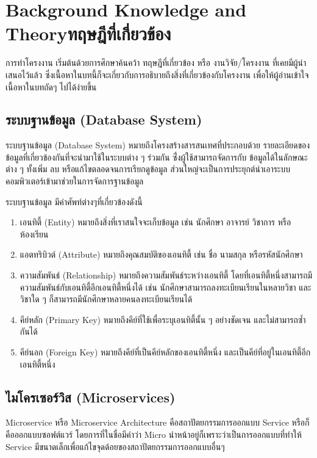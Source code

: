 \chapter{\ifenglish Background Knowledge and Theory\else ทฤษฎีที่เกี่ยวข้อง\fi}

\hspace{1.27cm}การทำโครงงาน เริ่มต้นด้วยการศึกษาค้นคว้า ทฤษฎีที่เกี่ยวข้อง หรือ งานวิจัย/โครงงาน ที่เคยมีผู้นำเสนอไว้แล้ว ซึ่งเนื้อหาในบทนี้ก็จะเกี่ยวกับการอธิบายถึงสิ่งที่เกี่ยวข้องกับโครงงาน เพื่อให้ผู้อ่านเข้าใจเนื้อหาในบทถัดๆ ไปได้ง่ายขึ้น

\section{ระบบฐานข้อมูล (Database System)}
\hspace{1.27cm}ระบบฐานข้อมูล (Database System) หมายถึงโครงสร้างสารสนเทศที่ประกอบด้วย รายละเอียดของข้อมูลที่เกี่ยวข้องกันที่จะนำมาใช้ในระบบต่าง ๆ ร่วมกัน  ซึ่่งผู้ใช้สามารถจัดการกับ
ข้อมูลได้ในลักษณะต่าง ๆ ทั้งเพิ่ม ลบ หรือแก้ไขตลอดจนการเรียกดูข้อมูล ส่วนใหญ่จะเป็นการประยุกต์นำเอาระบบคอมพิวเตอร์เข้ามาช่วยในการจัดการฐานข้อมูล

ระบบฐานข้อมูล มีคำศัพท์ต่างๆที่เกี่ยวข้องดังนี้

\begin{enumerate}
  \hangindent=2em 
  \item เอนทิตี้ (Entity) หมายถึงสิ่งที่เราสนใจจะเก็บข้อมูล เช่น นักศึกษา อาจารย์ วิชาการ หรือห้องเรียน
  \item แอตทริบิวต์ (Attribute) หมายถึงคุณสมบัติของเอนทิตี้ เช่น ชื่อ นามสกุล หรือรหัสนักศึกษา
  \item ความสัมพันธ์ (Relationship) หมายถึงความสัมพันธ์ระหว่างเอนทิตี้ โดยที่เอนทิตี้หนึ่งสามารถมีความสัมพันธ์กับเอนทิตี้อีกเอนทิตี้หนึ่งได้ เช่น นักศึกษาสามารถลงทะเบียนเรียนในหลายวิชา และวิชาใด ๆ ก็สามารถมีนักศึกษาหลายคนลงทะเบียนเรียนได้
  \item คีย์หลัก (Primary Key) หมายถึงคีย์ที่ใช้เพื่อระบุเอนทิตี้นั้น ๆ อย่างชัดเจน และไม่สามารถซ้ำกันได้  
  \item คีย์นอก (Foreign Key) หมายถึงคีย์ที่เป็นคีย์หลักของเอนทิตี้หนึ่ง และเป็นคีย์ที่อยู่ในเอนทิตี้อีกเอนทิตี้หนึ่ง  
\end{enumerate}



\section{ไมโครเซอร์วิส (Microservices)}
\hspace{1.27cm}Microservice\cite{microservice} หรือ Microservice Architecture คือสถาปัตยกรรมการออกแบบ Service หรือก็คือออกแบบซอฟต์แวร์ โดยการที่ในชื่อมีคำว่า Micro นำหน้าอยู่ก็เพราะว่าเป็นการออกแบบที่ทำให้ Service มีขนาดเล็กเพื่อแก้ไขจุดด้อยของสถาปัตยกรรมการออกแบบอื่นๆ 

